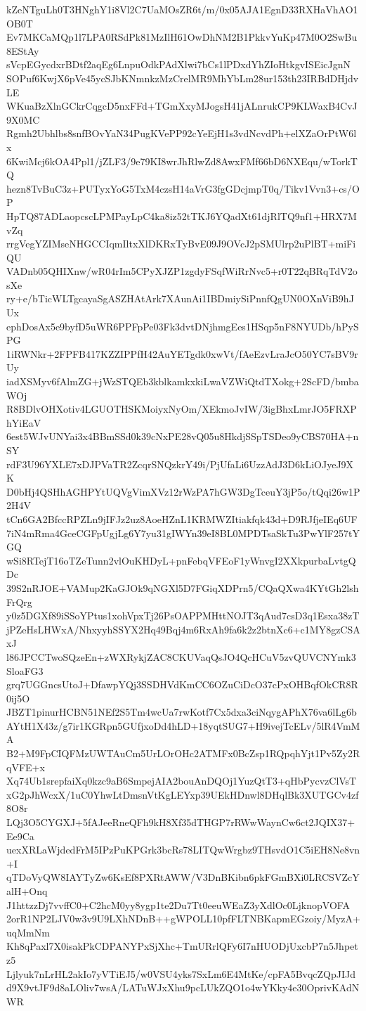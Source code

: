 kZeNTguLh0T3HNghY1i8Vl2C7UaMOsZR6t/m/0x05AJA1EgnD33RXHaVhAO1OB0T
Ev7MKCaMQp1l7LPA0RSdPk81MzIlH61OwDhNM2B1PkkvYuKp47M0O2SwBu8EStAy
sVcpEGycdxrBDtf2aqEg6LnpuOdkPAdXlwi7bCs1lPDxdYhZIoHtkgvISEicJgnN
SOPuf6KwjX6pVe45ycSJbKNmnkzMzCrelMR9MhYbLm28ur153th23IRBdDHjdvLE
WKuaBzXlnGCkrCqgcD5nxFFd+TGmXxyMJogsH41jALnrukCP9KLWaxB4CvJ9X0MC
Rgmh2Ubhlbs8snfBOvYaN34PugKVePP92cYeEjH1s3vdNcvdPh+elXZaOrPtW6lx
6KwiMcj6kOA4Ppl1/jZLF3/9e79KI8wrJhRlwZd8AwxFMf66bD6NXEqu/wTorkTQ
hezn8TvBuC3z+PUTyxYoG5TxM4czsH14aVrG3fgGDcjmpT0q/Tikv1Vvn3+cs/OP
HpTQ87ADLaopcscLPMPayLpC4ka8iz52tTKJ6YQadXt61djRlTQ9nf1+HRX7MvZq
rrgVegYZIMseNHGCCIqmIltxXlDKRxTyBvE09J9OVcJ2pSMUlrp2uPlBT+miFiQU
VADnb05QHIXnw/wR04rIm5CPyXJZP1zgdyFSqfWiRrNvc5+r0T22qBRqTdV2osXe
ry+e/bTicWLTgcayaSgASZHAtArk7XAunAi1IBDmiySiPnnfQgUN0OXnViB9hJUx
ephDosAx5e9byfD5uWR6PPFpPe03Fk3dvtDNjhmgEes1HSqp5nF8NYUDb/hPySPG
1iRWNkr+2FPFB417KZZIPPfH42AuYETgdk0xwVt/fAeEzvLraJcO50YC7sBV9rUy
iadXSMyv6fAlmZG+jWzSTQEb3kblkamkxkiLwaVZWiQtdTXokg+2ScFD/bmbaWOj
R8BDlvOHXotiv4LGUOTHSKMoiyxNyOm/XEkmoJvIW/3igBhxLmrJO5FRXPhYiEaV
6est5WJvUNYai3x4BBmSSd0k39cNxPE28vQ05u8HkdjSSpTSDeo9yCBS70HA+nSY
rdF3U96YXLE7xDJPVaTR2ZcqrSNQzkrY49i/PjUfaLi6UzzAdJ3D6kLiOJyeJ9XK
D0bHj4QSHhAGHPYtUQVgVimXVz12rWzPA7hGW3DgTceuY3jP5o/tQqi26w1P2H4V
tCn6GA2BfccRPZLn9jIFJz2uz8AoeHZnL1KRMWZItiakfqk43d+D9RJfjeIEq6UF
7iN4mRma4GceCGFpUgjLg6Y7yu31gIWYn39eI8BL0MPDTsaSkTu3PwYlF257tYGQ
wSi8RTejT16oTZeTunn2vlOuKHDyL+pnFebqVFEoF1yWnvgI2XXkpurbaLvtgQDc
39S2nRJOE+VAMup2KaGJOk9qNGXl5D7FGiqXDPrn5/CQaQXwa4KYtGh2lshFrQrg
y0z5DGXf89iSSoYPtus1xohVpxTj26PsOAPPMHttNOJT3qAud7csD3q1Esxa38zT
jPZeHsLHWxA/NhxyyhSSYX2Hq49Bqj4m6RxAh9fa6k2z2btnXc6+c1MY8gzCSAxJ
l86JPCCTwoSQzeEn+zWXRykjZAC8CKUVaqQsJO4QcHCuV5zvQUVCNYmk3SloaFG3
grq7UGGncsUtoJ+DfawpYQj3SSDHVdKmCC6OZuCiDcO37cPxOHBqfOkCR8R0ij5O
JBZT1pinurHCBN51NEf2S5Tm4wcUa7rwKotf7Cx5dxa3ciNqygAPhX76va6lLg6b
AYtH1X43z/g7ir1KGRpn5GUfjxoDd4hLD+18yqtSUG7+H9ivejTcELv/5lR4VmMA
B2+M9FpCIQFMzUWTAuCm5UrLOrOHc2ATMFx0BcZsp1RQpqhYjt1Pv5Zy2RqVFE+x
Xq74Ub1srepfaiXq0kzc9aB6SmpejAIA2bouAnDQOj1YuzQtT3+qHbPycvzClVsT
xG2pJhWcxX/1uC0YhwLtDmsnVtKgLEYxp39UEkHDnwl8DHqlBk3XUTGCv4zf8O8r
LQj3O5CYGXJ+5fAJeeRneQFh9kH8Xf35dTHGP7rRWwWaynCw6ct2JQIX37+Ee9Ca
uexXRLaWjdedFrM5IPzPuKPGrk3bcRs78LITQwWrgbz9THsvdO1C5iEH8Ne8vn+I
qTDoVyQW8IAYTyZw6KsEf8PXRtAWW/V3DnBKibn6pkFGmBXi0LRCSVZcYalH+Onq
J1httzzDj7vvffC0+C2hcM0yy8ygp1te2Du7Tt0eeuWEaZ3yXdlOc0LjknopVOFA
2orR1NP2LJV0w3v9U9LXhNDnB++gWPOLL10pfFLTNBKapmEGzoiy/MyzA+uqMmNm
Kh8qPaxl7X0isakPkCDPANYPxSjXhc+TmURrlQFy6I7nHUODjUxcbP7n5Jhpetz5
Ljlyuk7nLrHL2akIo7yVTiEJ5/w0VSU4yks7SxLm6E4MtKe/cpFA5BvqcZQpJIJd
d9X9vtJF9d8aLOliv7wsA/LATuWJxXhu9pcLUkZQO1o4wYKky4e30OprivKAdNWR
